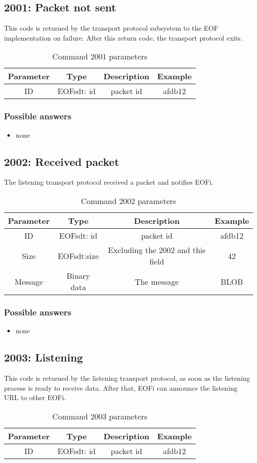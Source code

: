 \subsection{2001: Packet not sent}
This code is returned by the transport protocol subsystem to the
EOF implementation on failure.
After this return code, the transport protocol exits.
\begin{longtable}{|c|c|c|c|}
\caption{Command 2001 parameters}\\
\hline
\textbf{Parameter} & \textbf{Type} & \textbf{Description} & \textbf{Example}\\
\hline
ID & EOFsdt: id & packet id & afdb12\\
\hline
\end{longtable}
\subsubsection{Possible answers}
\begin{itemize}
\item none
\end{itemize}
\subsection{2002: Received packet}
The listening transport protocol received a packet and notifies EOFi.
\begin{longtable}{|c|c|c|c|}
\caption{Command 2002 parameters}\\
\hline
\textbf{Parameter} & \textbf{Type} & \textbf{Description} & \textbf{Example}\\
\hline
ID & EOFsdt: id & packet id & afdb12\\
\hline
Size & EOFsdt:size & Excluding the 2002 and this field & 42\\
\hline
Message & Binary data & The message & BLOB\\
\hline
\end{longtable}
\subsubsection{Possible answers}
\begin{itemize}
\item none
\end{itemize}
\subsection{2003: Listening}
This code is returned by the listening transport protocol, as soon as the
listening process is ready to receive data. After that, EOFi can announce
the listening URL to other EOFi.
\begin{longtable}{|c|c|c|c|}
\caption{Command 2003 parameters}\\
\hline
\textbf{Parameter} & \textbf{Type} & \textbf{Description} & \textbf{Example}\\
\hline
ID & EOFsdt: id & packet id & afdb12\\
\hline
\end{longtable}
